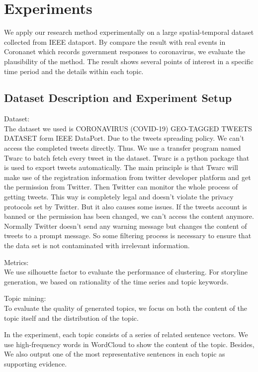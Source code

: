 \section{Experiments}
\label{sec:exp}
We apply our research method experimentally on a large spatial-temporal dataset collected from IEEE dataport. By compare the result with real events in Coronanet which records government responses to coronavirus, we evaluate the plausibility of the method. The result shows several points of interest in a specific time period and the details within each topic.
\subsection{Dataset Description and Experiment Setup}
Dataset: \\
The dataset we used is CORONAVIRUS (COVID-19) GEO-TAGGED TWEETS DATASET form IEEE DataPort. Due to the tweets spreading policy. We can’t access the completed tweets directly. Thus. We use a transfer program named Twarc to batch fetch every tweet in the dataset. Twarc is a python package that is used to export tweets automatically. The main principle is that Twarc will make use of the registration information from twitter developer platform and get the permission from Twitter. Then Twitter can monitor the whole process of getting tweets. This way is completely legal and doesn’t violate the privacy protocols set by Twitter. But it also causes some issues. If the tweets account is banned or the permission has been changed, we can’t access the content anymore. Normally Twitter doesn’t send any warning message but changes the content of tweets to a prompt message. So some filtering process is necessary to ensure that the data set is not contaminated with irrelevant information.


Metrics:\\
We use silhouette factor to evaluate the performance of clustering. For storyline generation, we based on rationality of the time series and topic keywords. 


Topic mining:\\
To evaluate the quality of generated topics, we focus on both the content of the topic itself and the distribution of the topic. 


In the experiment, each topic consists of a series of related sentence vectors. We use high-frequency words in WordCloud to show the content of the topic. Besides, We also output one of the most representative sentences in each topic as supporting evidence. 


